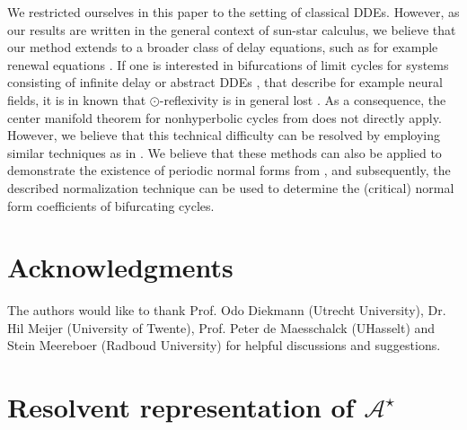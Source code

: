 \documentclass[english]{myarticle}
\begin{document}
\begin{sloppypar}
We restricted ourselves in this paper to the setting of classical DDEs. However, as our results are written in the general context of sun-star calculus, we believe that our method extends to a broader class of delay equations, such as for example renewal equations \cite{Breda2020,Diekmann2008,Diekmann1995}. If one is interested in bifurcations of limit cycles for systems consisting of infinite delay \cite{Diekmann2012,Hino1991,Liu2020} or abstract DDEs \cite{Janssens2019,Janssens2020,Spek2022a,Spek2020,Spek2024}, that describe for example neural fields, it is in known that $\odot$-reflexivity is in general lost \cite[Theorem 12]{Spek2020}. As a consequence, the center manifold theorem for nonhyperbolic cycles from \cite{Article1} does not directly apply. However, we believe that this technical difficulty can be resolved by
employing similar techniques as in \cite{Janssens2020}. We believe that these methods can also be applied to demonstrate the existence of periodic normal forms from \cite{Article2}, and subsequently, the described normalization technique can be used to determine the (critical) normal form coefficients of bifurcating cycles.

\section*{Acknowledgments}
The authors would like to thank Prof. Odo Diekmann (Utrecht University), Dr. Hil Meijer (University of Twente), Prof. Peter de Maesschalck (UHasselt) and Stein Meereboer (Radboud University) for helpful discussions and suggestions.

\appendix
\section{Resolvent representation of $\mathcal{A}^\star$}


\end{sloppypar}
\end{document}
